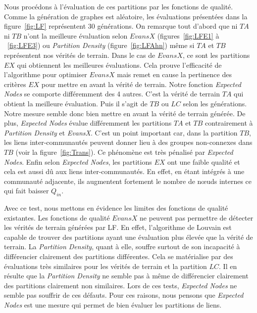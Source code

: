 Nous procédons à l'évaluation de ces partitions par les fonctions de qualité.
Comme la génération de graphes est aléatoire, les évaluations présentées dans la figure~\ref{fig:LF} représentent $30$ générations.
On remarque tout d'abord que ni $TA$ ni $TB$ n'ont la meilleure évaluation selon $EvansX$ (figures~\ref{fig:LFE1} à ~\ref{fig:LFE3}) ou \emph{Partition Density} (figure~\ref{fig:LFAhn}) même si $TA$ et $TB$ représentent nos vérités de terrain.
Dans le cas de $EvansX$, ce sont les partitions $EX$ qui obtiennent les meilleures évaluations.
Cela prouve l'efficacité de l'algorithme pour optimiser $EvansX$ mais remet en cause la pertinence des critères $EX$ pour mettre en avant la vérité de terrain.
Notre fonction \emph{Expected Nodes} se comporte différemment des 4 autres.
C'est la vérité de terrain $TA$ qui obtient la meilleure évaluation.
Puis il s'agit de $TB$ ou $LC$ selon les générations.
Notre mesure semble donc bien mettre en avant la vérité de terrain générée.
De plus, \emph{Expected Nodes} évalue différemment les partitions $TA$ et $TB$ contrairement à \emph{Partition Density} et \emph{EvansX}.
C'est un point important car, dans la partition $TB$, les liens inter-communautés peuvent donner lieu à des groupes non-connexes dans $TB$ (voir la figure~\ref{fig:Trans}).
Ce phénomène est très pénalisé par \emph{Expected Nodes}.
Enfin selon \emph{Expected Nodes}, les partitions $EX$ ont une faible qualité et cela est aussi dû aux liens inter-communautés.
En effet, en étant intégrés à une communauté adjacente, ils augmentent fortement le nombre de n\oe{}uds internes ce qui fait baisser $Q_{in}$.

Avec ce test, nous mettons en évidence les limites des fonctions de qualité existantes.
Les fonctions de qualité $EvansX$ ne peuvent pas permettre de détecter les vérités de terrain générées par LF.
En effet, l'algorithme de Louvain est capable de trouver des partitions ayant une évaluation plus élevée que la vérité de terrain.
La \emph{Partition Density}, quant à elle, souffre surtout de son incapacité à différencier clairement des partitions différentes.
Cela se matérialise par des évaluations très similaires pour les vérités de terrain et la partition $LC$.
Il en résulte que la \emph{Partition Density} ne semble pas à même de différencier clairement des partitions clairement non similaires.
Lors de ces tests, \emph{Expected Nodes} ne semble pas souffrir de ces défauts.
Pour ces raisons, nous pensons que \emph{Expected Nodes} est une mesure qui permet de bien évaluer les partitions de liens.

